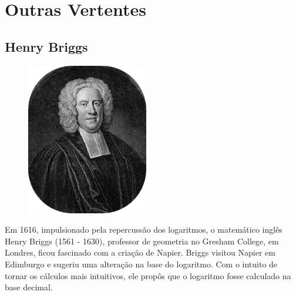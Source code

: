 \section{Outras Vertentes}

\subsection{Henry Briggs}
\begin{figure}
    \setlength{\intextsep}{0pt}
    \vspace{-1.5em} 
    \centering
    \includegraphics[width=\linewidth]{img/briggs.png} 
\end{figure}

Em 1616, impulsionado pela repercussão dos logaritmos, o matemático inglês Henry Briggs (1561 - 1630), professor de geometria no Gresham College, em Londres, ficou fascinado com a criação de Napier. Briggs visitou Napier em Edimburgo e sugeriu uma alteração na base do logaritmo. Com o intuito de tornar os cálculos mais intuitivos, ele propôs que o logaritmo fosse calculado na base decimal.

